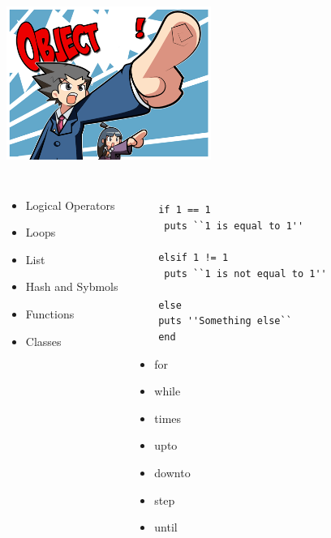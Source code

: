 \documentclass[xcolor=svgnames]{beamer}
\newcommand\Fontvi{\fontsize{30}{7.2}\selectfont}
\begin{document}
\begin{frame}
\transwipe
\Fontvi
\color{Maroon}{In Ruby, everything is}
\begin{center}
  \includegraphics[width=0.5\textwidth]{object.png}
\end{center}
\end{frame}
\begin{frame}[fragile]
\transwipe
\begin{columns}[c]	
  \column{1.5in}
  \begin{itemize}
    \item \alert<+>{Logical Operators}
    \item \alert<+>{Loops} 
    \item \alert<+> {List} 
    \item \alert<+>{Hash and Sybmols}
    \item \alert<+>{Functions}
    \item \alert<+>{Classes}
  \end{itemize}

  \column{2.5in}
  \begin{overprint}
      \begin{verbatim}
	
	if 1 == 1
	 puts ``1 is equal to 1''
	
	elsif 1 != 1
	 puts ``1 is not equal to 1''
	
	else
	puts ''Something else``
	end
      \end{verbatim}
    \begin{itemize}
    	\item for
	\item while
	\item times
	\item upto
	\item downto
	\item step
	\item until
    \end{itemize}
      \begin{verbatim}



\end{verbatim}
\end{overprint}
\end{columns}
\end{frame}
\end{document}
